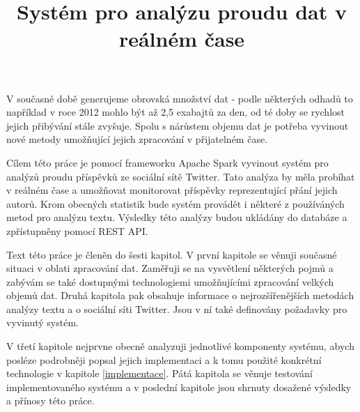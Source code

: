 \documentclass[thesis=B,czech]{FITthesis}[2012/06/26]
\title{Systém pro analýzu proudu dat v reálném čase}
\begin{document}

\begin{introduction}
	V současné době generujeme obrovská množství dat - podle některých odhadů to například v roce 2012 mohlo být až 2,5 exabajtů za den\cite{bbc-bigdata}, od té doby se rychlost jejich přibývání stále zvyšuje. Spolu s nárůstem objemu dat je potřeba vyvinout nové metody umožňující jejich zpracování v přijatelném čase. 
	
	Cílem této práce je pomocí frameworku Apache Spark vyvinout systém pro analýzů proudu příspěvků ze sociální sítě Twitter. Tato analýza by měla probíhat v reálném čase a umožňovat monitorovat příspěvky reprezentující přání jejich autorů. Krom obecných statistik bude systém provádět i některé z používáných metod pro analýzu textu. Výsledky této analýzy budou ukládány do databáze a zpřístupněny pomocí REST API. 
	
	Text této práce je členěn do šesti kapitol. V první kapitole se věnuji současné situaci v oblati zpracování dat. Zaměřuji se na vysvětlení některých pojmů a zabývám se také dostupnými technologiemi umožňujícími zpracování velkých objemů dat. Druhá kapitola pak obsahuje informace o nejrozšířenějších metodách analýzy textu a o sociální síti Twitter. Jsou v ní také definovány požadavky pro vyvinutý systém. 
	
	V třetí kapitole nejprvne obecně analyzuji jednotlivé komponenty systému, abych posléze podrobněji popsal jejich implementaci a k tomu použité konkrétní technologie v kapitole \ref{implementace}. Pátá kapitola se věnuje testování implementovaného systému a v poslední kapitole jsou shrnuty dosažené výsledky a přínosy této práce. 
	
\end{introduction}

%
\end{document}
